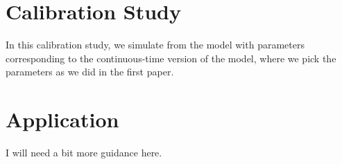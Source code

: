 \documentclass[10pt]{article}
\begin{document}
\section{Calibration Study}
In this calibration study, we simulate from the model with parameters
corresponding to the continuous-time version of the model, where we
pick the parameters as we did in the first paper.

\section{Application}
I will need a bit more guidance here.



\end{document}
